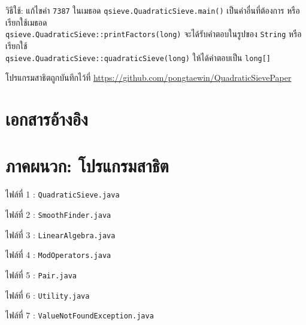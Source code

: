 \documentclass[20pt,a4paper]{article}
\begin{document}
\vspace{2mm}

วิธีใช้: แก้ไขค่า \verb |7387| ในเมธอด \verb |qsieve.QuadraticSieve.main()| เป็นค่าอื่นที่ต้องการ หรือเรียกใช้เมธอด \\ \verb |qsieve.QuadraticSieve::printFactors(long)| จะได้รับคำตอบในรูปของ  \verb |String| หรือเรียกใช้ \\ \verb |qsieve.QuadraticSieve::quadraticSieve(long)| ให้ได้คำตอบเป็น \verb |long[]| \\

\vspace{2mm}

โปรแกรมสาธิตถูกบันทึกไว้ที่ \url{https://github.com/pongtaewin/QuadraticSievePaper}
\renewcommand\refname{\vskip -1cm}
\section{เอกสารอ้างอิง}






\lstset{style=mystyle}


\section{ภาคผนวก: โปรแกรมสาธิต}
ไฟล์ที่ 1 : \verb|QuadraticSieve.java|


ไฟล์ที่ 2 : \verb|SmoothFinder.java|


\newpage

ไฟล์ที่ 3 : \verb|LinearAlgebra.java|


\newpage
ไฟล์ที่ 4 : \verb|ModOperators.java|


ไฟล์ที่ 5 : \verb|Pair.java|


ไฟล์ที่ 6 : \verb|Utility.java|


ไฟล์ที่ 7 : \verb|ValueNotFoundException.java|

\end{document}
